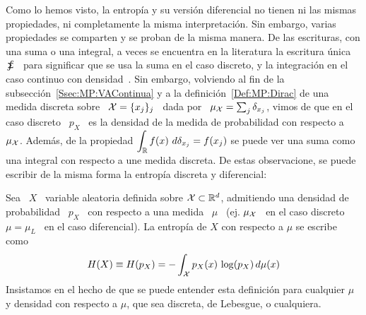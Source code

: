 Como lo hemos  visto, la entrop\'ia y su versi\'on diferencial  no tienen ni las
mismas  propiedades, ni  completamente la  misma interpretaci\'on.  Sin embargo,
varias  propiedades  se  comparten y  se  proban  de  la  misma manera.  De  las
escrituras, con una  suma o una integral, a veces se  encuentra en la literatura
la escritura \'unica \ $\sumint$ \ para significar que se usa la suma en el caso
discreto, y la integraci\'on en el caso continuo con densidad~\cite{Rio07}.  Sin
embargo,   volviendo  al   fin   de  la   subsecci\'on~\ref{Ssec:MP:VAContinua}
y a la  definici\'on~\ref{Def:MP:Dirac} de una medida discreta sobre  \ $\mathcal{X} = \{
x_j \}_j$ \ dada  por \ $\mu_{\mathcal{X}} = \sum_j \delta_{x_j}$, vimos  de que en el caso
discreto \ $p_X$ \  es la densidad de la medida de  probabilidad con respecto a \
$\mu_{\mathcal{X}}$.   Adem\'as,   de  la   propiedad  $\displaystyle  \int_{\mathbb{R}}   f(x)  \
d\delta_{x_j} =  f(x_j)$ se puede ver una  suma como una integral  con respecto a
une medida discreta.  De estas observacione, se puede escribir de la misma forma
la entrop\'ia discreta y diferencial:
%
\begin{definicion}
\label{Def:SZ:ShanonMu}
%
Sea \ $X$ \ variable aleatoria definida sobre $\mathcal{X} \subset \mathbb{R}^d$, admitiendo
una  densidad de  probabilidad \  $p_X$ \  con respecto  a una  medida \  $\mu$ \
(ej.  $\mu_{\mathcal{X}}$  \  en   el  caso  discreto  \  $\mu  =  \mu_L$   \  en  el  caso
diferencial). La entrop\'ia de $X$ con respecto a $\mu$ se escribe como
  \[
  H(X) \equiv H(p_X) = - \int_{\mathcal{X}} p_X(x) \, \log(p_X) \, d\mu(x)
  \]
  Insistamos  en  el hecho  de  que se  puede  entender  esta definici\'on  para
  cualquier $\mu$ y densidad con respecto a $\mu$, que sea discreta, de Lebesgue,
  o cualquiera.
\end{definicion}
